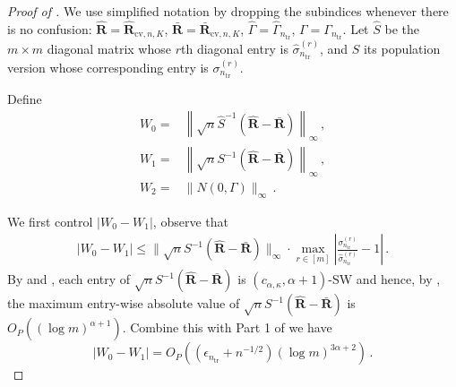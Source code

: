 \documentclass[11pt]{article}
\theoremstyle{plain}
\newcommand{\cv}{{\mathrm{cv}}}
\newcommand{\tr}{{\mathrm{tr}}}
\begin{document}
\begin{proof}
    [Proof of ]
    We use simplified notation by dropping the subindices whenever there is no confusion: $\hat{\mathbf R} = \hat{\mathbf R}_{\cv,n,K}$,   $\bar{\mathbf R}=\bar{\mathbf R}_{\cv,n,K}$, $\hat\Gamma=\hat\Gamma_{n_\tr}$, $\Gamma=\Gamma_{n_\tr}$.
   Let $\hat S$ be the $m\times m$ diagonal matrix whose $r$th diagonal entry is $\hat\sigma_{n_\tr}^{(r)}$, and $S$ its population version whose corresponding entry is $\sigma_{n_\tr}^{(r)}$.  

Define   \begin{align*}
      W_0 = & \left\|\sqrt{n}\hat S^{-1}(\hat{\mathbf R}-\bar{\mathbf R})\right\|_\infty\,,\\
      W_1 = & \left\|\sqrt{n} S^{-1}(\hat{\mathbf R}-\bar{\mathbf R})\right\|_\infty\,,     \\
      W_2= & \|N(0,\Gamma)\|_\infty\,.  \end{align*}

We first control $|W_0-W_1|$, observe that
\begin{align*}
    |W_0-W_1|\le \|\sqrt{n}S^{-1}(\hat{\mathbf R}-\bar{\mathbf R})\|_\infty \cdot \max_{r\in[m]}\left|\frac{\sigma_{n_\tr}^{(r)}}{\hat\sigma_{n_\tr}^{(r)}}-1\right|\,.
\end{align*}
By  and , each entry of
$\sqrt{n}S^{-1}(\hat{\mathbf R}-\bar{\mathbf R})$ is $(c_{\alpha,\kappa},\alpha+1)$-SW and hence, by , the maximum entry-wise absolute value of $\sqrt{n}S^{-1}(\hat{\mathbf R}-\bar{\mathbf R})$ is $O_P((\log m)^{\alpha+1})$. Combine this with Part 1 of   we have 
$$
|W_0-W_1|=O_P\left((\epsilon_{n_\tr}+n^{-1/2})(\log m)^{3\alpha+2}\right)\,.
$$


\end{proof}
\end{document}
